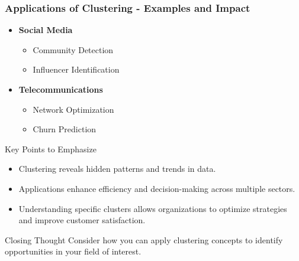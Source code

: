 \documentclass[aspectratio=169]{beamer}
\begin{document}
\begin{frame}[fragile]
    \frametitle{Applications of Clustering - Examples and Impact}
    \begin{itemize}
        \item \textbf{Social Media}
            \begin{itemize}
                \item Community Detection 
                \item Influencer Identification
            \end{itemize}
        \item \textbf{Telecommunications}
            \begin{itemize}
                \item Network Optimization 
                \item Churn Prediction
            \end{itemize}
    \end{itemize}
    \begin{block}{Key Points to Emphasize}
        \begin{itemize}
            \item Clustering reveals hidden patterns and trends in data.
            \item Applications enhance efficiency and decision-making across multiple sectors.
            \item Understanding specific clusters allows organizations to optimize strategies and improve customer satisfaction.
        \end{itemize}
    \end{block}
    \begin{block}{Closing Thought}
        Consider how you can apply clustering concepts to identify opportunities in your field of interest.
    \end{block}
\end{frame}
\end{document}
